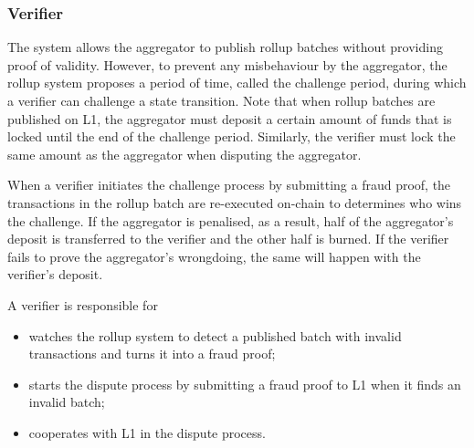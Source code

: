 \documentclass{article}
\begin{document}

\subsubsection{Verifier}
The system allows the aggregator to publish rollup batches without providing proof of validity. However, to prevent any misbehaviour by the aggregator, the rollup system proposes a period of time, called the challenge period, during which a verifier can challenge a state transition. Note that when rollup batches are published on L1, the aggregator must deposit a certain amount of funds that is locked until the end of the challenge period. Similarly, the verifier must lock the same amount as the aggregator when disputing the aggregator.

When a verifier initiates the challenge process by submitting a fraud proof, the transactions in the rollup batch are re-executed on-chain to determines who wins the challenge. If the aggregator is penalised, as a result, half of the aggregator's deposit is transferred to the verifier and the other half is burned. If the verifier fails to prove the aggregator's wrongdoing, the same will happen with the verifier's deposit.

A verifier is responsible for
\begin{itemize} 
\item watches the rollup system to detect a published batch with invalid transactions and turns it into a fraud proof;
\item starts the dispute process by submitting a fraud proof to L1 when it finds an invalid batch; 
\item cooperates with L1 in the dispute process.
\end{itemize}
\end{document}
